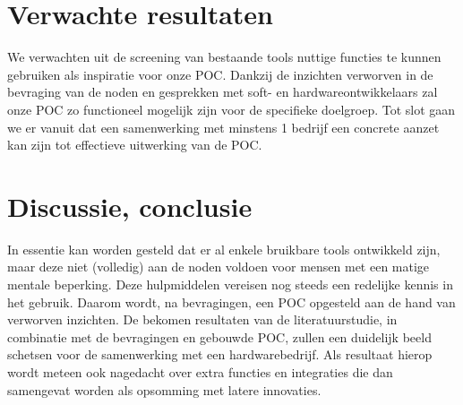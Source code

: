 \documentclass{hogent-article}
\begin{document}
    \section{Verwachte resultaten}%
    \label{sec:verwachte-resultaten}
    
    
    We verwachten uit de screening van bestaande tools nuttige functies te kunnen gebruiken als inspiratie voor onze POC. Dankzij de inzichten verworven in de bevraging van de noden en gesprekken met soft- en hardwareontwikkelaars zal onze POC zo functioneel mogelijk zijn voor de specifieke doelgroep. Tot slot gaan we er vanuit dat een samenwerking met minstens 1 bedrijf een concrete aanzet kan zijn tot effectieve uitwerking van de POC.
    
    
    \section{Discussie, conclusie}%
    \label{sec:discussie-conclusie}
    In essentie kan worden gesteld dat er al enkele bruikbare tools ontwikkeld zijn, maar deze niet (volledig) aan de noden voldoen voor mensen met een matige mentale beperking. Deze hulpmiddelen vereisen nog steeds een redelijke kennis in het gebruik. Daarom wordt, na bevragingen, een POC opgesteld aan de hand van verworven inzichten. De bekomen resultaten van de literatuurstudie, in combinatie met de bevragingen en gebouwde POC, zullen een duidelijk beeld schetsen voor de samenwerking met een hardwarebedrijf. Als resultaat hierop wordt meteen ook nagedacht over extra functies en integraties die dan samengevat worden als opsomming met latere innovaties.
\end{document}
